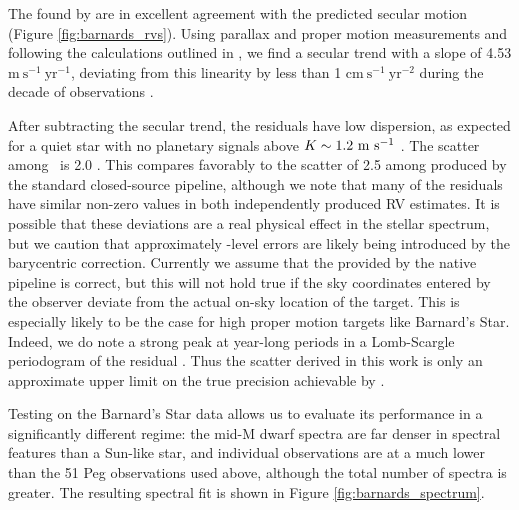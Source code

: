 \documentclass[modern]{aastex62}
\newcommand{\Mdwarf}{Barnard's Star\xspace} %
\begin{document}
The \RVs found by \wobble are in excellent agreement with the predicted secular motion (Figure \ref{fig:barnards_rvs}). 
Using \gaia parallax and proper motion measurements and following the calculations outlined in \citet{Kurster2003}, we find a secular trend with a slope of 4.53 $\mathrm{m}~\mathrm{s}^{-1}~\mathrm{yr}^{-1}$, deviating from this linearity by less than 1 $\mathrm{cm}~\mathrm{s}^{-1}~\mathrm{yr}^{-2}$ during the decade of \HARPS observations \citep{gaia2016, gaia2018}. 

After subtracting the secular \RV trend, the residuals have low dispersion, as expected for a quiet star with no planetary signals above $K \sim 1.2~\mathrm{m}~\mathrm{s}^{-1}$ \citep{Choi2013, Ribas2018}. 
The  scatter among \wobble\ \RVs is 2.0 \ms. 
This compares favorably to the scatter of 2.5 \ms among \RVs produced by the standard closed-source \HARPS pipeline, although we note that many of the residuals have similar non-zero values in both independently produced RV estimates. 
It is possible that these deviations are a real physical effect in the stellar spectrum, but we caution that approximately \ms-level errors are likely being introduced by the barycentric correction. 
Currently we assume that the \BERV provided by the native \HARPS pipeline is correct, but this will not hold true if the sky coordinates entered by the observer deviate from the actual on-sky location of the target. 
This is especially likely to be the case for high proper motion targets like \Mdwarf. 
Indeed, we do note a strong peak at year-long periods in a Lomb-Scargle periodogram of the residual \RVs. 
Thus the \RV scatter derived in this work is only an approximate upper limit on the true precision achievable by \wobble.  

Testing \wobble on the \Mdwarf data allows us to evaluate its performance in a significantly different regime: the mid-M dwarf spectra are far denser in spectral features than a Sun-like star, and individual observations are at a much lower \SNR than the 51 Peg observations used above, although the total number of spectra is greater. 
The resulting spectral fit is shown in Figure \ref{fig:barnards_spectrum}.
\end{document}
